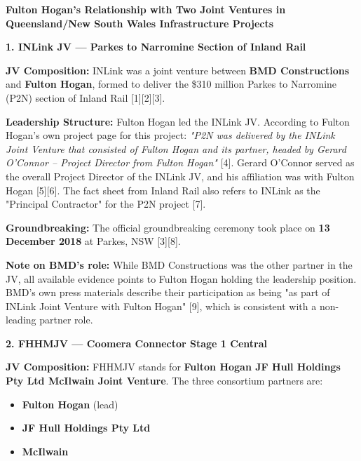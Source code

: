 \documentclass[table]{gtech}
\begin{document}
\begin{tcolorbox}[breakable,enhanced jigsaw,colback=green!4,colframe=green!55,boxrule=0.4pt,left=5pt,right=5pt,top=3pt,bottom=3pt,fonttitle=\bfseries\sffamily\small,coltitle=black,fontupper=\small,title={Sub-agent report}]
\smallskip\noindent\textbf{Fulton Hogan's Relationship with Two Joint Ventures in Queensland/New South Wales Infrastructure Projects}\par\smallskip

\smallskip\noindent\textbf{1. INLink JV --- Parkes to Narromine Section of Inland Rail}\par\smallskip

\textbf{JV Composition:} INLink was a joint venture between \textbf{BMD Constructions} and \textbf{Fulton Hogan}, formed to deliver the \$310 million Parkes to Narromine (P2N) section of Inland Rail [1][2][3].

\textbf{Leadership Structure:} Fulton Hogan led the INLink JV. According to Fulton Hogan's own project page for this project: \emph{"P2N was delivered by the INLink Joint Venture that consisted of Fulton Hogan and its partner, headed by Gerard O'Connor -- Project Director from Fulton Hogan"} [4]. Gerard O'Connor served as the overall Project Director of the INLink JV, and his affiliation was with Fulton Hogan [5][6]. The fact sheet from Inland Rail also refers to INLink as the "Principal Contractor" for the P2N project [7].

\textbf{Groundbreaking:} The official groundbreaking ceremony took place on \textbf{13 December 2018} at Parkes, NSW [3][8].

\textbf{Note on BMD's role:} While BMD Constructions was the other partner in the JV, all available evidence points to Fulton Hogan holding the leadership position. BMD's own press materials describe their participation as being "as part of INLink Joint Venture with Fulton Hogan" [9], which is consistent with a non-leading partner role.

\smallskip\noindent\textbf{2. FHHMJV --- Coomera Connector Stage 1 Central}\par\smallskip

\textbf{JV Composition:} FHHMJV stands for \textbf{Fulton Hogan JF Hull Holdings Pty Ltd McIlwain Joint Venture}. The three consortium partners are:

\begin{itemize}[leftmargin=1.3em,topsep=2pt,itemsep=1pt,parsep=0pt]
\item \textbf{Fulton Hogan} (lead)
\item \textbf{JF Hull Holdings Pty Ltd}
\item \textbf{McIlwain}
\end{itemize}


\end{tcolorbox}
\end{document}
